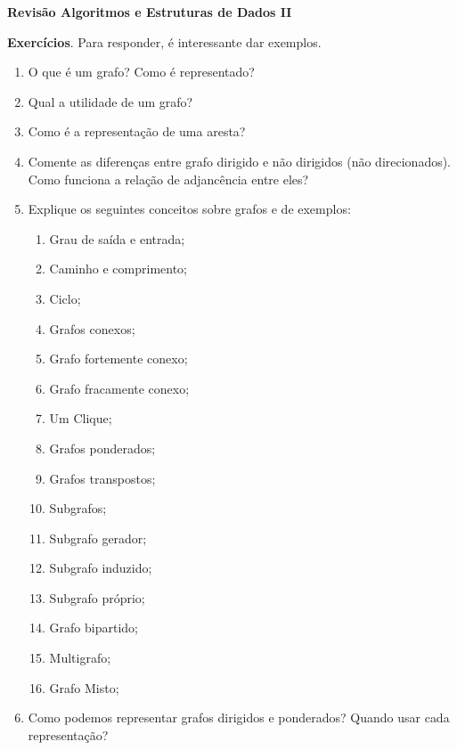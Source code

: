 \documentclass[11pt, a4paper]{article}
\begin{document}
	\begin{center}
	\textbf{Revisão Algoritmos e Estruturas de Dados II}
	\end{center}
\textbf{Exercícios}.
Para responder, é interessante dar exemplos.

\begin{enumerate}
\item O que é um grafo? Como é representado?
\item Qual a utilidade de um grafo?
\item Como é a representação de uma aresta?
\item Comente as diferenças entre grafo dirigido e não dirigidos (não direcionados). Como funciona a relação de adjancência entre eles?
\item Explique os seguintes conceitos sobre grafos e de exemplos:
	\begin{enumerate}
	\item Grau de saída e entrada;
	\item Caminho e comprimento;
	\item Ciclo;
	\item Grafos conexos;
	\item Grafo fortemente conexo;
	\item Grafo fracamente conexo;
	\item Um Clique;
	\item Grafos ponderados;
	\item Grafos transpostos;
	\item Subgrafos;
	\item Subgrafo gerador;
	\item Subgrafo induzido;
	\item Subgrafo próprio;
	\item Grafo bipartido;
	\item Multigrafo;
	\item Grafo Misto;
	\end{enumerate}
\item Como podemos representar grafos dirigidos e ponderados? Quando usar cada representação?


\end{enumerate}
\end{document}
